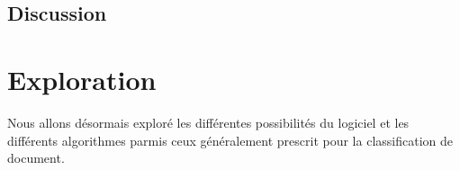 \documentclass[a4paper,10pt]{article}
\begin{document}
\subsection{Discussion}


\section{Exploration}

Nous allons désormais exploré les différentes possibilités du logiciel et les différents algorithmes parmis ceux généralement prescrit pour la classification de document.








\end{document}
